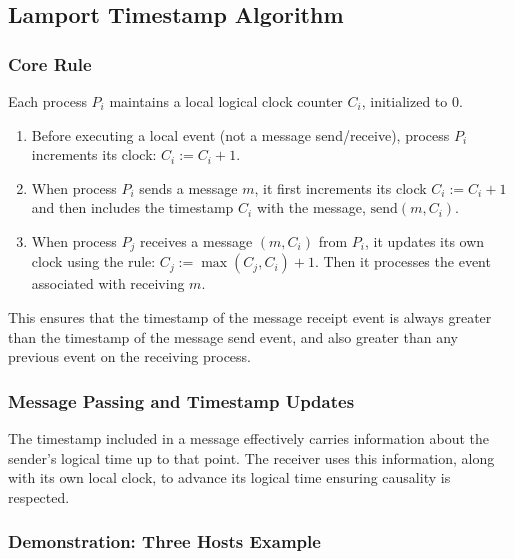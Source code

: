 \subsection{Lamport Timestamp Algorithm}

\subsubsection{Core Rule}
Each process \( P_i \) maintains a local logical clock counter \( C_i \), initialized to 0.
\begin{enumerate}[label=\roman*), noitemsep]
    \item Before executing a local event (not a message send/receive), process \( P_i \) increments its clock: \( C_i := C_i + 1 \).
    \item When process \( P_i \) sends a message \( m \), it first increments its clock \( C_i := C_i + 1 \) and then includes the timestamp \( C_i \) with the message, \( \text{send}(m, C_i) \).
    \item When process \( P_j \) receives a message \( (m, C_i) \) from \( P_i \), it updates its own clock using the rule: \( C_j := \max(C_j, C_i) + 1 \). Then it processes the event associated with receiving \( m \).
\end{enumerate}
This ensures that the timestamp of the message receipt event is always greater than the timestamp of the message send event, and also greater than any previous event on the receiving process.

\subsubsection{Message Passing and Timestamp Updates}
The timestamp included in a message effectively carries information about the sender's logical time up to that point. The receiver uses this information, along with its own local clock, to advance its logical time ensuring causality is respected.


\subsubsection{Demonstration: Three Hosts Example}

